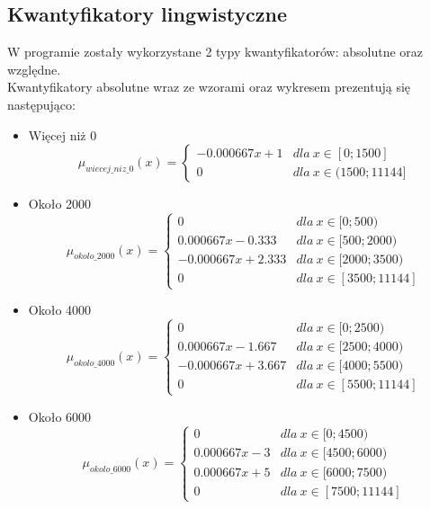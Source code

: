 \documentclass{classrep}
\begin{document}
\subsection{Kwantyfikatory lingwistyczne}
W programie zostały wykorzystane 2 typy kwantyfikatorów: absolutne oraz względne.\\
Kwantyfikatory absolutne wraz ze wzorami oraz wykresem prezentują się następująco:
\begin{itemize}
        \item Więcej niż 0
        \begin{equation}
            \mu_{wiecej\_niz\_0}(x) = \left\{\begin{matrix} -0.000667x + 1 & dla \: x\in[0;1500] \\ 0 & dla  \: x\in (1500;11144] \end{matrix}\right.
        \end{equation}
        \item Około 2000
        \begin{equation}
            \mu_{okolo\_2000}(x) = \left\{\begin{matrix} 0 & dla \: x\in [0;500) \\ 0.000667x - 0.333 & dla \: x\in[500;2000) \\ -0.000667x + 2.333& dla \: x\in [2000; 3500) \\ 0 & dla \: x\in[3500;11144] \end{matrix}\right.
        \end{equation}
        \item Około 4000
        \begin{equation}
            \mu_{okolo\_4000}(x) = \left\{\begin{matrix} 0 & dla \: x\in [0;2500) \\ 0.000667x - 1.667 & dla \: x\in[2500;4000) \\ -0.000667x + 3.667 & dla \: x\in [4000; 5500) \\ 0 & dla \: x\in[5500;11144] \end{matrix}\right.
        \end{equation}
        \item Około 6000
        \begin{equation}
            \mu_{okolo\_6000}(x) = \left\{\begin{matrix} 0 & dla \: x\in [0;4500) \\ 0.000667x - 3 & dla \: x\in[4500;6000) \\ 0.000667x + 5 & dla \: x\in [6000; 7500) \\ 0 & dla \: x\in[7500; 11144] \end{matrix}\right.

\end{equation}
\end{itemize}
\end{document}
